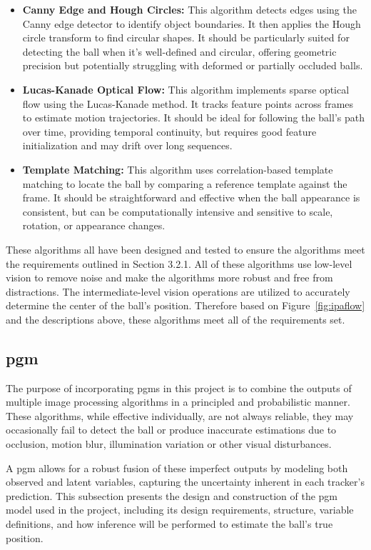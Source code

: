 \documentclass[12pt,a4paper]{article}
\begin{document}
\begin{itemize}
    \item \textbf{Canny Edge and Hough Circles:} This algorithm detects edges using the Canny edge detector to identify object boundaries. It then applies the Hough circle transform to find circular shapes. It should be particularly suited for detecting the ball when it's well-defined and circular, offering geometric precision but potentially struggling with deformed or partially occluded balls.
    
    \item \textbf{Lucas-Kanade Optical Flow:} This algorithm implements sparse optical flow using the Lucas-Kanade method. It tracks feature points across frames to estimate motion trajectories. It should be ideal for following the ball's path over time, providing temporal continuity, but requires good feature initialization and may drift over long sequences.
    
    \item \textbf{Template Matching:} This algorithm uses correlation-based template matching to locate the ball by comparing a reference template against the frame. It should be straightforward and effective when the ball appearance is consistent, but can be computationally intensive and sensitive to scale, rotation, or appearance changes.
\end{itemize}

These algorithms all have been designed and tested to ensure the algorithms meet the requirements outlined in Section 3.2.1. All of these algorithms use low-level vision to remove noise and make the algorithms more robust and free from distractions. The intermediate-level vision operations are utilized to accurately determine the center of the ball's position. Therefore based on Figure~\ref{fig:ipaflow} and the descriptions above, these algorithms meet all of the requirements set.

\subsection{\acl{pgm}}
The purpose of incorporating \acp{pgm} in this project is to combine the outputs of multiple image processing algorithms in a principled and probabilistic manner. These algorithms, while effective individually, are not always reliable, they may occasionally fail to detect the ball or produce inaccurate estimations due to occlusion, motion blur, illumination variation or other visual disturbances. 

A \acs{pgm} allows for a robust fusion of these imperfect outputs by modeling both observed and latent variables, capturing the uncertainty inherent in each tracker’s prediction. This subsection presents the design and construction of the \acs{pgm} model used in the project, including its design requirements, structure, variable definitions, and how inference will be performed to estimate the ball's true position.
\end{document}
